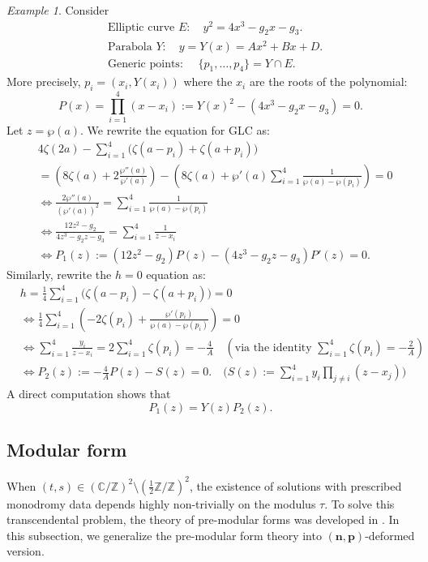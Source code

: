 \documentclass[11pt]{amsart}
\theoremstyle{remark}
\newtheorem{example}[theorem]{Example}
\numberwithin{equation}{section}
\begin{document}
\begin{example}
Consider
\[
\begin{split}
 &\text{Elliptic curve } E: \quad y^2 = 4x^3 - g_2x - g_3.
 \\
 &\text{Parabola } Y: \quad y = Y(x) = Ax^2 + Bx + D.
    \\
 &\text{Generic points: } \quad \{ p_1,\dots,p_4 \} = Y \cap E.
\end{split}
\]
More precisely, $p_i = ( x_i, Y(x_i) )$ where the $x_i$ are the roots of the polynomial:
$$    P(x) = \prod_{i=1}^4 (x - x_i) := Y(x)^2 - (4x^3 - g_2x - g_3) = 0 .$$
Let $z = \wp(a)$. We rewrite the equation for GLC as:
\[
\begin{split}
 & 4\zeta(2a) - \sum_{i=1}^4 \Big( \zeta(a-p_i) + \zeta(a+p_i) \Big)
 \\
 & =\left( 8\zeta(a) + 2\frac{\wp''(a)}{\wp'(a)} \right) - \left( 8\zeta(a) + \wp'(a) \sum_{i=1}^4 \frac{1}{\wp(a)-\wp(p_i)} \right) =0
 \\
 & \Longleftrightarrow \frac{2\wp''(a)}{(\wp'(a))^2} = \sum_{i=1}^4 \frac{1}{\wp(a)-\wp(p_i)} \\
 &\Longleftrightarrow \frac{12z^2 - g_2}{4z^3 - g_2z - g_3} = \sum_{i=1}^4 \frac{1}{z - x_i}
 \\
 & \Longleftrightarrow P_{1}(z) := (12z^2 - g_2)P(z) - (4z^3 - g_2z - g_3)P'(z) = 0.
\end{split}
\]
Similarly, rewrite the $h=0$ equation as:
\[
\begin{split}
 & h = \frac{1}{4} \sum_{i=1}^4 \Big( \zeta(a-p_i) - \zeta(a + p_i) \Big) = 0
    \\
    & \Longleftrightarrow \frac{1}{4} \sum_{i=1}^4 \left( -2\zeta(p_i) + \frac{\wp'(p_i)}{\wp(a) - \wp(p_i)} \right) = 0
    \\
    & \Longleftrightarrow \sum_{i=1}^4 \frac{y_i}{z - x_i} = 2 \sum_{i=1}^4 \zeta(p_i) = -\frac{4}{A} \quad \left( \text{via the identity } \sum_{i=1}^4 \zeta(p_i) = -\frac{2}{A} \right)
    \\
    & \Longleftrightarrow P_2(z) := -\frac{4}{A} P(z) - S(z)= 0. \quad \Bigg(S(z) :=\sum_{i=1}^4 y_i \prod_{j \neq i} (z - x_j) \Bigg)
\end{split}
\]
A direct computation shows that 
\[
P_1(z) = Y(z) P_2(z).
\]
\end{example}









\subsection{Modular form}
When $(t,s) \in (\mathbb{C}/\mathbb{Z})^2 \setminus (\tfrac{1}{2} \mathbb{Z} / \mathbb{Z})^2$, the existence of solutions with prescribed monodromy data depends highly non-trivially on the modulus $\tau$. To solve this transcendental problem, the theory of pre-modular forms was developed in \cite{Lin_Wang_2017}.  In this subsection, we generalize the pre-modular form theory into $(\mathbf{n}, \mathbf{p})$-deformed version.
\end{document}
